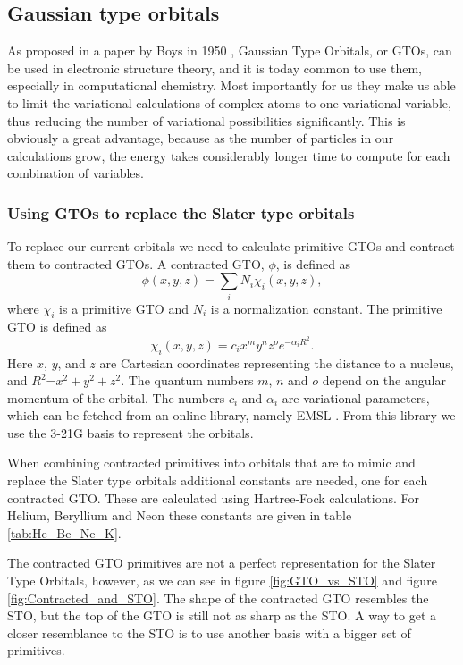 
\subsection{Gaussian type orbitals}

	As proposed in a paper by Boys in 1950 \parencite{Boys_1950},
	Gaussian Type Orbitals, or GTOs, can be used in electronic structure
	theory, and it is today common to use them, especially in computational
	chemistry. Most importantly for us they make us able to limit the
	variational calculations of complex atoms to one variational variable,
	thus reducing the number of variational possibilities significantly.
	This is obviously a great advantage, because as the number of particles
	in our calculations grow, the energy takes considerably longer time
	to compute for each combination of variables. 


	\subsubsection{Using GTOs to replace the Slater type orbitals}

		To replace our current orbitals we need to calculate primitive GTOs
		and contract them to contracted GTOs. A contracted GTO, $\phi$,
		is defined as
		\[
		\phi\left(x,y,z\right)=\sum_{i}N_{i}\chi_{i}\left(x,y,z\right),
		\]
		where $\chi_{i}$ is a primitive GTO and $N_{i}$ is a normalization
		constant. The primitive GTO is defined as
		\[
		\chi_{i}\left(x,y,z\right)=c_{i}x^{m}y^{n}z^{o}e^{-\alpha_{i}R^{2}}.
		\]
		Here $x$, $y$, and $z$ are Cartesian coordinates representing the
		distance to a nucleus, and $R^{2}$=$x^{2}+y^{2}+z^{2}$. The quantum
		numbers $m$, $n$ and $o$ depend on the angular momentum of the
		orbital. The numbers $c_{i}$ and $\alpha_{i}$ are variational parameters,
		which can be fetched from an online library, namely EMSL \parencite{Binkley_1980}\parencite{EMSL}.
		From this library we use the 3-21G basis to represent the orbitals.

		When combining contracted primitives into orbitals that are to mimic
		and replace the Slater type orbitals additional constants are needed,
		one for each contracted GTO. These are calculated using Hartree-Fock
		calculations. For Helium, Beryllium and Neon these constants are given
		in table \ref{tab:He_Be_Ne_K}. 

		The contracted GTO primitives are not a perfect representation for the
		Slater Type Orbitals, however, as we can see in figure \ref{fig:GTO_vs_STO} 
		and figure \ref{fig:Contracted_and_STO}. The shape of the contracted GTO 
		resembles the STO, but the top of the GTO is still not as sharp as the STO.
		A way to get a closer resemblance to the STO is to use another basis with 
		a bigger set of primitives.

